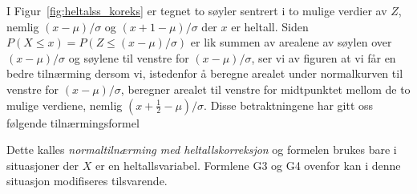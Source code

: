 I Figur~\ref{fig:heltalss_koreks} er tegnet to søyler sentrert i
to mulige verdier av $Z$, nemlig $(x-\mu)/\sigma$ og $(x+1-\mu)
/\sigma$ der $x$ er heltall. Siden $P(X\leq x)=P(Z\leq (x-\mu)
/\sigma)$ er lik summen av arealene av søylen over $(x-\mu)
/\sigma$ og søylene til venstre for $(x-\mu)/\sigma$, ser vi av
figuren at vi får en bedre tilnærming dersom vi, istedenfor å
beregne arealet under normalkurven til venstre for $(x-\mu)
/\sigma$, beregner arealet til venstre for midtpunktet mellom de
to mulige verdiene, nemlig $(x+\frac{1}{2}-\mu)/\sigma$. Disse
betraktningene har gitt oss følgende tilnærmingsformel

\begin{center}  \end{center}

\noindent Dette kalles {\em normaltilnærming med heltallskorreksjon} og
formelen brukes bare i situasjoner der $X$ er en
heltallsvariabel. Formlene G3 og G4 ovenfor kan i denne situasjon
modifiseres tilsvarende.\\

